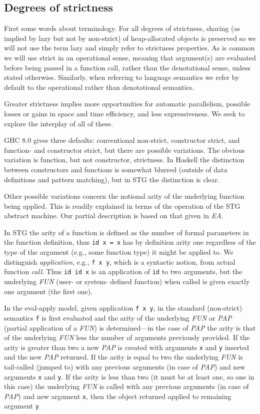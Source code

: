 \documentclass{llncs}
\begin{document}
\subsection{Degrees of strictness}
First some words about terminology.  For all degrees of strictness, sharing
(as implied by lazy but not by non-strict) of heap-allocated objects is
preserved so we will not use the term lazy and simply refer to
strictness properties.  As is common we will use strict in an operational
sense, meaning that argument(s) are evaluated before being passed in a
function call, rather than the denotational sense, unless stated otherwise.
Similarly, when referring to language semantics we refer by default to the
operational rather than denotational semantics.

Greater strictness implies more opportunities for automatic parallelism,
possible losses or gains in space and time efficiency, and less expressiveness.  We
seek to explore the interplay of all of these.

GHC 8.0 gives three defaults: conventional non-strict, constructor strict, and
function- and constructor strict, but there are possible variations.  The
obvious variation is function, but not constructor, strictness.  In Haskell
the distinction between constructors and functions is somewhat blurred
(outside of data definitions and pattern matching), but in STG the distinction
is clear.

Other possible variations concern the notional arity of the underlying
function being applied.  This is readily explained in terms of the operation
of the STG abstract machine.  Our partial description is based on that given
in \emph{EA}.

In STG the arity of a function is defined as the number of formal parameters
in the function definition, thus \texttt{id x = x} has by definition arity one
regardless of the type of the argument (e.g., some function type) it might be
applied to.  We distinguish \emph{application}, e.g., \texttt{f x y}, which is
a syntactic notion, from actual function \emph{call}. Thus \texttt{id id x} is
an application of \texttt{id} to two arguments, but the underlying \emph{FUN}
(user- or system- defined function) when called is given exactly one
argument (the first one).

In the eval-apply model, given application \texttt{f x y}, in the standard
(non-strict) semantics \texttt{f} is first evaluated and the arity of the
underlying \emph{FUN} or \emph{PAP} (partial application of a \emph{FUN}) is
determined---in the case of \emph{PAP} the arity is that of the underlying
\emph{FUN} less the number of arguments previously provided.  If the arity is
greater than two a new \emph{PAP} is created with arguments \texttt{x} and
\texttt{y} inserted and the new \emph{PAP} returned.  If the arity is equal to
two the underlying \emph{FUN} is tail-called (jumped to) with any previous
arguments (in case of \emph{PAP}) and new arguments \texttt{x} and \texttt{y}.
If the arity is less than two (it must be at least one, so one in this case)
the underlying \emph{FUN} is called with any previous arguments (in case of
\emph{PAP}) and new argument \texttt{x}, then the object returned applied to
remaining argument \texttt{y}.
\end{document}
